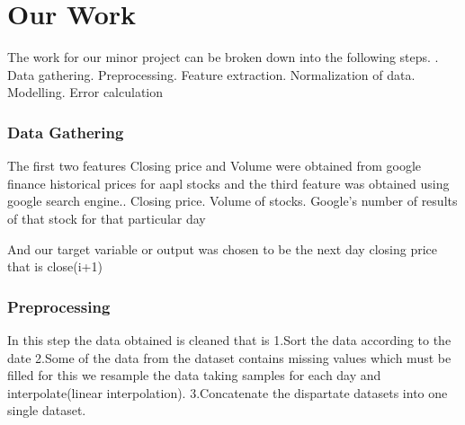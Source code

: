 \documentclass{report}
\begin{document}
\chapter{Our Work}
The work for our minor project can be broken down into the following steps.\newline
{}. Data gathering\newline{}. Preprocessing\newline{}. Feature extraction\newline{}. Normalization of data\newline{}. Modelling\newline{}. Error calculation
\newpage
\subsection{Data Gathering}
The first two features Closing price and Volume were obtained from google finance historical prices for aapl stocks
and the third feature was obtained using google search engine.\newline{}. Closing price\newline{}. Volume of stocks\newline{}. Google's number of results of that stock for that particular day\newline\newline

And our target variable or output was chosen to be the next day closing price that is close(i+1)
\newpage
\subsection{Preprocessing}
In this step the data obtained is cleaned that is 
\newline\newline
1.Sort the data according to the date
\newline\newline
2.Some of the data from the dataset contains missing values which must be filled for this we resample the data taking samples for each day and interpolate(linear interpolation).
\newline\newline
3.Concatenate the dispartate datasets into one single dataset.
\newpage
\end{document}
